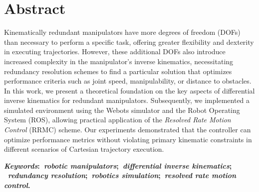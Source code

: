 \chapter*{Abstract}
\noindent Kinematically redundant manipulators have more degrees of freedom (DOFs) than necessary to perform a specific task,
 offering greater flexibility and dexterity in executing trajectories. However, these additional DOFs also introduce increased
  complexity in the manipulator's inverse kinematics, necessitating redundancy resolution schemes to find a particular solution 
  that optimizes performance criteria such as joint speed, manipulability, or distance to obstacles. In this work, we present a 
  theoretical foundation on the key aspects of differential inverse kinematics for redundant manipulators. Subsequently, we 
  implemented a simulated environment using the Webots simulator and the Robot Operating System (ROS), allowing practical 
  application of the \emph{Resolved Rate Motion Control} (RRMC) scheme. Our experiments demonstrated that the controller can 
  optimize performance metrics without violating primary kinematic constraints in different scenarios of Cartesian trajectory execution.

  \vspace{5mm}

\noindent\textbf{
    \textit{Keywords}:~\textit{robotic manipulators};~\textit{differential inverse kinematics};
    ~\textit{redundancy resolution};~\textit{robotics simulation};~\textit{resolved rate motion control}.
}
